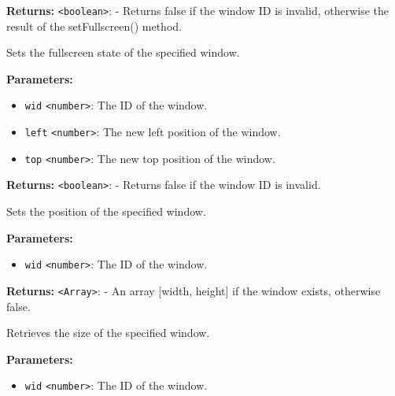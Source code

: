 \documentclass[12pt,a4paper]{article}
\begin{document}
\noindent \textbf{Returns:} \texttt{<boolean>}: - Returns false if the window ID is invalid, otherwise the result of the setFullscreen() method.

\noindent Sets the fullscreen state of the specified window.

\vspace{5mm}
\noindent {}


\noindent \textbf{Parameters:}
\begin{itemize}
  \item \texttt{wid} \texttt{<number>}: The ID of the window.
  \item \texttt{left} \texttt{<number>}: The new left position of the window.
  \item \texttt{top} \texttt{<number>}: The new top position of the window.
\end{itemize}

\noindent \textbf{Returns:} \texttt{<boolean>}: - Returns false if the window ID is invalid.

\noindent Sets the position of the specified window.

\vspace{5mm}
\noindent {}


\noindent \textbf{Parameters:}
\begin{itemize}
  \item \texttt{wid} \texttt{<number>}: The ID of the window.
\end{itemize}

\noindent \textbf{Returns:} \texttt{<Array>}: - An array [width, height] if the window exists, otherwise false.

\noindent Retrieves the size of the specified window.

\vspace{5mm}
\noindent {}


\noindent \textbf{Parameters:}
\begin{itemize}
  \item \texttt{wid} \texttt{<number>}: The ID of the window.
\end{itemize}
\end{document}
